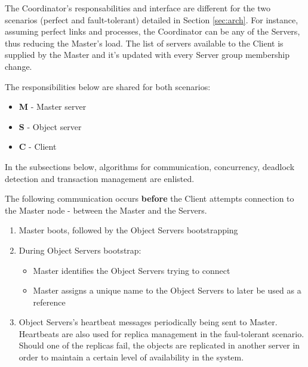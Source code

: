 \documentclass[times, 10pt,twocolumn]{article}
\begin{document}
\label{subsec:respon}

The Coordinator's responsabilities and interface are different for the two scenarios (perfect and fault-tolerant) detailed in Section \ref{sec:arch}. For instance, assuming perfect links and processes, the Coordinator can be any of the Servers, thus reducing the Master's load. The list of servers available to the Client is supplied by the Master and it's updated with every Server group membership change.

The responsibilities below are shared for both scenarios:
\begin{itemize}[noitemsep,nolistsep]
\item {\bf M} - Master server 
\item {\bf S} - Object server
\item {\bf C} - Client      
\end{itemize}

\label{sec:algor}
In the subsections below, algorithms for communication, concurrency, deadlock detection and transaction management are enlisted.

The following communication occurs {\bf before} the Client attempts connection to the Master node - between the Master and the Servers.

\begin{enumerate}
\item Master boots, followed by the Object Servers bootstrapping
\item During Object Servers bootstrap:
\begin{itemize}[noitemsep, nolistsep]
\item Master identifies the Object Servers trying to connect
\item Master assigns a unique name to the Object Servers to later be used as a reference
\end{itemize}
\item Object Servers's heartbeat messages periodically being sent to Master. Heartbeats are also used for replica management in the faul-tolerant scenario. Should one of the replicas fail, the objects are replicated in another server in order to maintain a certain level of availability in the system.
\end{enumerate}
\end{document}
